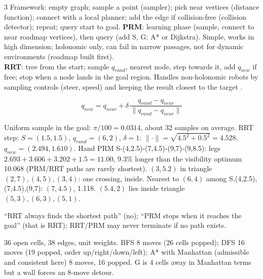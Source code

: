 \begin{multicols}{3}
Framework: empty graph; sample a point (sampler); pick near vertices (distance function); connect with a local planner; add the edge if collision-free (collision detector); repeat; query start to goal.
\textbf{PRM}: learning phase (sample, connect to near roadmap vertices), then query (add S, G; A* or Dijkstra). Simple, works in high dimension; holonomic only, can fail in narrow passages, not for dynamic environments (roadmap built first).\\
\textbf{RRT}: tree from the start; sample $q_{rand}$, nearest node, step towards it, add $q_{new}$ if free; stop when a node lands in the goal region. Handles non-holonomic robots by sampling controls (steer, speed) and keeping the result closest to the target .
\begin{fbx}
\[q_{new}=q_{near}+\delta\,\frac{q_{rand}-q_{near}}{\|q_{rand}-q_{near}\|}\]
\end{fbx}
\begin{worked}[practical Q2 map: $C={[0,10]^2}$, goal disc radius 1 at $(9,9)$]
Uniform sample in the goal: $\pi/100=0.0314$, about 32 samples on average. RRT step: $S=(1.5,1.5)$, $q_{rand}=(6,2)$, $\delta=1$: $\|{\cdot}\|=\sqrt{4.5^2+0.5^2}=4.528$, $q_{new}=(2.494,1.610)$. Hand PRM S-(4,2.5)-(7,4.5)-(9,7)-(9,8.5): legs $2.693+3.606+3.202+1.5=11.00$, 9.3\% longer than the visibility optimum 10.068 (PRM/RRT paths are rarely shortest). $(3,5.2)$ in triangle $(2,7),(4,5),(3,4)$: one crossing, inside. Nearest to $(6,4)$ among S,(4,2.5),(7,4.5),(9,7): $(7,4.5)$, 1.118. $(5.4,2)$ lies inside triangle $(5,3),(6,3),(5,1)$. \chk
\end{worked}
\begin{trap}
``RRT always finds the shortest path'' (no); ``PRM stops when it reaches the goal'' (that is RRT); RRT/PRM may never terminate if no path exists.
\end{trap}

36 open cells, 38 edges, unit weights. BFS 8 moves (26 cells popped); DFS 16 moves (19 popped, order up/right/down/left); A* with Manhattan (admissible and consistent here) 8 moves, 16 popped. G is 4 cells away in Manhattan terms but a wall forces an 8-move detour. \chk


\end{multicols}
